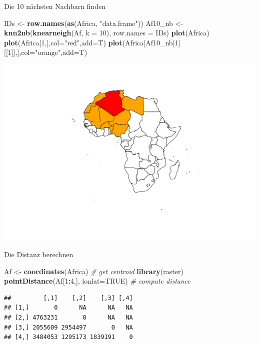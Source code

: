 \documentclass[ignorenonframetext,]{beamer}
\newenvironment{Shaded}{\begin{snugshade}}{\end{snugshade}}
\newcommand{\KeywordTok}[1]{\textcolor[rgb]{0.13,0.29,0.53}{\textbf{#1}}}
\newcommand{\DataTypeTok}[1]{\textcolor[rgb]{0.13,0.29,0.53}{#1}}
\newcommand{\DecValTok}[1]{\textcolor[rgb]{0.00,0.00,0.81}{#1}}
\newcommand{\StringTok}[1]{\textcolor[rgb]{0.31,0.60,0.02}{#1}}
\newcommand{\CommentTok}[1]{\textcolor[rgb]{0.56,0.35,0.01}{\textit{#1}}}
\newcommand{\OtherTok}[1]{\textcolor[rgb]{0.56,0.35,0.01}{#1}}
\newcommand{\OperatorTok}[1]{\textcolor[rgb]{0.81,0.36,0.00}{\textbf{#1}}}
\newcommand{\NormalTok}[1]{#1}
\begin{document}
\begin{frame}[fragile]{Die 10 nächsten Nachbarn finden}

\begin{Shaded}
\begin{Highlighting}[]
\NormalTok{IDs <-}\StringTok{ }\KeywordTok{row.names}\NormalTok{(}\KeywordTok{as}\NormalTok{(Africa, }\StringTok{"data.frame"}\NormalTok{))}
\NormalTok{Af10_nb <-}\StringTok{ }\KeywordTok{knn2nb}\NormalTok{(}\KeywordTok{knearneigh}\NormalTok{(Af, }\DataTypeTok{k =} \DecValTok{10}\NormalTok{), }\DataTypeTok{row.names =}\NormalTok{ IDs)}
\KeywordTok{plot}\NormalTok{(Africa)}
\KeywordTok{plot}\NormalTok{(Africa[}\DecValTok{1}\NormalTok{,],}\DataTypeTok{col=}\StringTok{"red"}\NormalTok{,}\DataTypeTok{add=}\NormalTok{T)}
\KeywordTok{plot}\NormalTok{(Africa[Af10_nb[}\DecValTok{1}\NormalTok{][[}\DecValTok{1}\NormalTok{]],],}\DataTypeTok{col=}\StringTok{"orange"}\NormalTok{,}\DataTypeTok{add=}\NormalTok{T)}
\end{Highlighting}
\end{Shaded}

\includegraphics{spdep_files/figure-beamer/unnamed-chunk-13-1.pdf}

\end{frame}

\begin{frame}[fragile]{Die Distanz berechnen}

\begin{Shaded}
\begin{Highlighting}[]
\NormalTok{Af <-}\StringTok{ }\KeywordTok{coordinates}\NormalTok{(Africa) }\CommentTok{# get centroid}
\KeywordTok{library}\NormalTok{(raster)}
\KeywordTok{pointDistance}\NormalTok{(Af[}\DecValTok{1}\OperatorTok{:}\DecValTok{4}\NormalTok{,], }\DataTypeTok{lonlat=}\OtherTok{TRUE}\NormalTok{) }\CommentTok{# compute distance}
\end{Highlighting}
\end{Shaded}

\begin{verbatim}
##         [,1]    [,2]    [,3] [,4]
## [1,]       0      NA      NA   NA
## [2,] 4763231       0      NA   NA
## [3,] 2055609 2954497       0   NA
## [4,] 3484053 1295173 1839191    0
\end{verbatim}

\end{frame}
\end{document}
